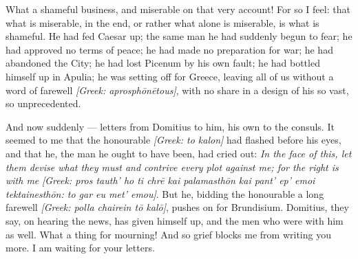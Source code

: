 

 What a shameful business, and miserable on that very account! For so I feel: that what is miserable, in the end, or rather what alone is miserable, is what is shameful. He had fed Caesar up; the same man he had suddenly begun to fear; he had approved no terms of peace; he had made no preparation for war; he had abandoned the City; he had lost Picenum by his own fault; he had bottled himself up in Apulia; he was setting off for Greece, leaving all of us without a word of farewell \textit{[Greek: aprosphōnētous]}, with no share in a design of his so vast, so unprecedented.

 And now suddenly --- letters from Domitius to him, his own to the consuls. It seemed to me that the honourable \textit{[Greek: to kalon]} had flashed before his eyes, and that he, the man he ought to have been, had cried out: \textit{In the face of this, let them devise what they must and contrive every plot against me; for the right is with me} \textit{[Greek: pros tauth' ho ti chrē kai palamasthōn kai pant' ep' emoi tektainesthōn: to gar eu met' emou]}. But he, bidding the honourable a long farewell \textit{[Greek: polla chairein tō kalō]}, pushes on for Brundisium. Domitius, they say, on hearing the news, has given himself up, and the men who were with him as well. What a thing for mourning! And so grief blocks me from writing you more. I am waiting for your letters.
